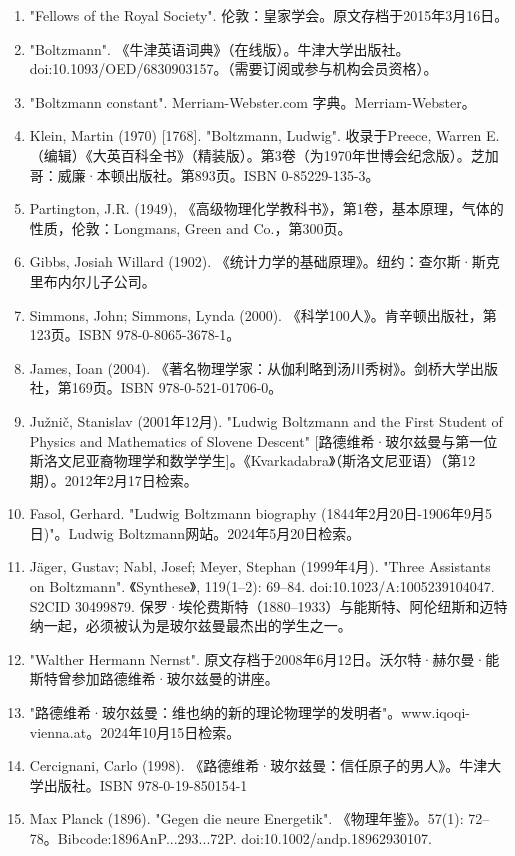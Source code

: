 \begin{enumerate}
\item "Fellows of the Royal Society". 伦敦：皇家学会。原文存档于2015年3月16日。  
\item "Boltzmann". 《牛津英语词典》（在线版）。牛津大学出版社。doi:10.1093/OED/6830903157。（需要订阅或参与机构会员资格）。  
\item "Boltzmann constant". Merriam-Webster.com 字典。Merriam-Webster。  
\item Klein, Martin (1970) [1768]. "Boltzmann, Ludwig". 收录于Preece, Warren E.（编辑）《大英百科全书》（精装版）。第3卷（为1970年世博会纪念版）。芝加哥：威廉·本顿出版社。第893页。ISBN 0-85229-135-3。  
\item Partington, J.R. (1949), 《高级物理化学教科书》，第1卷，基本原理，气体的性质，伦敦：Longmans, Green and Co.，第300页。  
\item Gibbs, Josiah Willard (1902). 《统计力学的基础原理》。纽约：查尔斯·斯克里布内尔儿子公司。  
\item Simmons, John; Simmons, Lynda (2000). 《科学100人》。肯辛顿出版社，第123页。ISBN 978-0-8065-3678-1。  
\item James, Ioan (2004). 《著名物理学家：从伽利略到汤川秀树》。剑桥大学出版社，第169页。ISBN 978-0-521-01706-0。  
\item Južnič, Stanislav (2001年12月). "Ludwig Boltzmann and the First Student of Physics and Mathematics of Slovene Descent" [路德维希·玻尔兹曼与第一位斯洛文尼亚裔物理学和数学学生]。《Kvarkadabra》（斯洛文尼亚语）（第12期）。2012年2月17日检索。  
\item Fasol, Gerhard. "Ludwig Boltzmann biography (1844年2月20日-1906年9月5日)"。Ludwig Boltzmann网站。2024年5月20日检索。
\item Jäger, Gustav; Nabl, Josef; Meyer, Stephan (1999年4月). "Three Assistants on Boltzmann". 《Synthese》, 119(1–2): 69–84. doi:10.1023/A:1005239104047. S2CID 30499879. 保罗·埃伦费斯特（1880–1933）与能斯特、阿伦纽斯和迈特纳一起，必须被认为是玻尔兹曼最杰出的学生之一。  
\item "Walther Hermann Nernst". 原文存档于2008年6月12日。沃尔特·赫尔曼·能斯特曾参加路德维希·玻尔兹曼的讲座。  
\item "路德维希·玻尔兹曼：维也纳的新的理论物理学的发明者"。www.iqoqi-vienna.at。2024年10月15日检索。  
\item Cercignani, Carlo (1998). 《路德维希·玻尔兹曼：信任原子的男人》。牛津大学出版社。ISBN 978-0-19-850154-1  
\item Max Planck (1896). "Gegen die neure Energetik". 《物理年鉴》。57(1): 72–78。Bibcode:1896AnP...293...72P. doi:10.1002/andp.18962930107.  

\end{enumerate}
